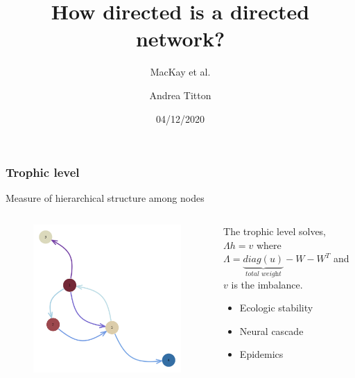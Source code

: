 \documentclass{beamer}
\title{How directed is a directed network?}
\subtitle{MacKay et al.}
\author{Andrea Titton}
\institute{Tinbergen Institute}
\date{04/12/2020}
\begin{document}
\frame{\titlepage}
\nocite{*}

\begin{frame}
    \frametitle{Trophic level}
    Measure of hierarchical structure among nodes
    \begin{columns}
        \begin{column}{.49\textwidth}
            \begin{figure}
                \includegraphics[width=0.8\linewidth,height=0.8\textheight,keepaspectratio]{../../plots/random/lv-network.png}
            \end{figure}
        \end{column}
        \begin{column}{.48\textwidth}
            The trophic level solves,
            $\Lambda h = v$ where
            $\Lambda = \underbrace{diag(u)}_{\textit{total weight}} - W - W^T$
            and $v$ is the imbalance.
            \hspace{2\unitlength}
            \begin{itemize}
                \item Ecologic stability
                \item Neural cascade
                \item Epidemics
            \end{itemize}
        \end{column}
    \end{columns}
\end{frame}
\end{document}
